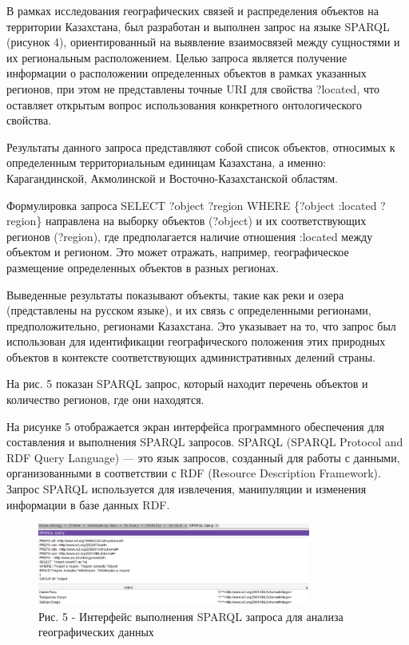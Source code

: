 \begin{multicols}{2}
В рамках исследования географических связей и распределения объектов на
территории Казахстана, был разработан и выполнен запрос на языке SPARQL
(рисунок 4), ориентированный на выявление взаимосвязей между сущностями
и их региональным расположением. Целью запроса является получение
информации о расположении определенных объектов в рамках указанных
регионов, при этом не представлены точные URI для свойства ?located, что
оставляет открытым вопрос использования конкретного онтологического
свойства.

Результаты данного запроса представляют собой список объектов, относимых
к определенным территориальным единицам Казахстана, а именно:
Карагандинской, Акмолинской и Восточно-Казахстанской областям.

Формулировка запроса SELECT ?object ?region WHERE \{?object :located
?region\} направлена на выборку объектов (?object) и их соответствующих
регионов (?region), где предполагается наличие отношения :located между
объектом и регионом. Это может отражать, например, географическое
размещение определенных объектов в разных регионах.

Выведенные результаты показывают объекты, такие как реки и озера
(представлены на русском языке), и их связь с определенными регионами,
предположительно, регионами Казахстана. Это указывает на то, что запрос
был использован для идентификации географического положения этих
природных объектов в контексте соответствующих административных делений
страны.

На рис. 5 показан SPARQL запрос, который находит перечень объектов и
количество регионов, где они находятся.

На рисунке 5 отображается экран интерфейса программного обеспечения для
составления и выполнения SPARQL запросов. SPARQL (SPARQL Protocol and
RDF Query Language) --- это язык запросов, созданный для работы с
данными, организованными в соответствии с RDF (Resource Description
Framework). Запрос SPARQL используется для извлечения, манипуляции и
изменения информации в базе данных RDF.
\end{multicols}

\begin{figure}[H]
	\centering
	\includegraphics[width=0.8\textwidth]{assets/42}
	\caption*{Рис. 5 - Интерфейс выполнения SPARQL запроса для анализа географических данных}
\end{figure}

